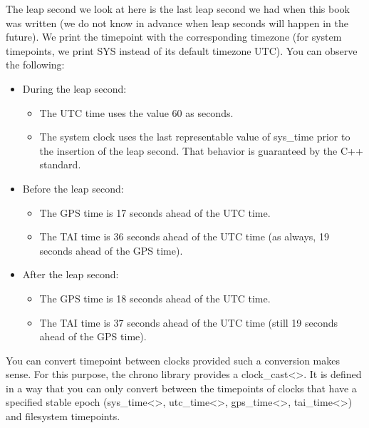The leap second we look at here is the last leap second we had when this book was written (we do not know in advance when leap seconds will happen in the future). We print the timepoint with the corresponding timezone (for system timepoints, we print SYS instead of its default timezone UTC). You can observe the following:

\begin{itemize}
\item 
During the leap second:

\begin{itemize}
\item 
The UTC time uses the value 60 as seconds.

\item 
The system clock uses the last representable value of sys\_time prior to the insertion of the leap second. That behavior is guaranteed by the C++ standard.
\end{itemize}

\item 
Before the leap second:

\begin{itemize}
\item 
The GPS time is 17 seconds ahead of the UTC time.

\item 
The TAI time is 36 seconds ahead of the UTC time (as always, 19 seconds ahead of the GPS time).
\end{itemize}

\item 
After the leap second:

\begin{itemize}
\item 
The GPS time is 18 seconds ahead of the UTC time.

\item 
The TAI time is 37 seconds ahead of the UTC time (still 19 seconds ahead of the GPS time).
\end{itemize}
\end{itemize}


You can convert timepoint between clocks provided such a conversion makes sense. For this purpose, the chrono library provides a clock\_cast<>. It is defined in a way that you can only convert between the timepoints of clocks that have a specified stable epoch (sys\_time<>, utc\_time<>, gps\_time<>, tai\_time<>) and filesystem timepoints.

